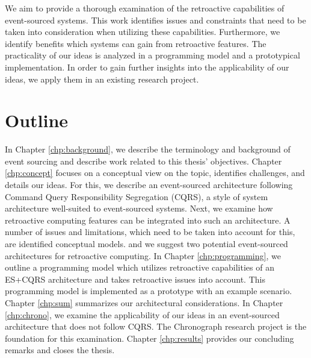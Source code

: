 We aim to provide a thorough examination of the retroactive capabilities of 
event-sourced systems. This work identifies issues and constraints that need 
to be taken into consideration when utilizing these capabilities. Furthermore, 
we identify benefits which systems can gain from retroactive features. The 
practicality of our ideas is analyzed in a programming model and a prototypical 
implementation. In order to gain further insights into the applicability of our 
ideas, we apply them in an existing research project.

\section{Outline}
In Chapter \ref{chp:background}, we describe the terminology and background of 
event sourcing and describe work related to this thesis' objectives. 
%
Chapter \ref{chp:concept} focuses on a conceptual view on the topic, identifies 
challenges, and details our ideas. For this, we describe an event-sourced 
architecture following Command Query Responsibility Segregation (CQRS), a style 
of system architecture well-suited to event-sourced systems. Next, we examine 
how retroactive computing features can be integrated into such an architecture.
A number of issues and limitations, which need to be taken into account for 
this, are identified %
conceptual models. and we suggest two potential event-sourced architectures for 
retroactive computing.
%
In Chapter \ref{chp:programming}, we outline a programming model which utilizes 
retroactive capabilities of an ES+CQRS architecture and takes retroactive issues 
into account.
This programming model is implemented as a prototype with an example scenario.
Chapter \ref{chp:sum} summarizes our architectural considerations.
%
In Chapter \ref{chp:chrono}, we examine the applicability of our ideas in an 
event-sourced architecture that does not follow CQRS. The Chronograph research 
project is the foundation for this examination.
%
Chapter \ref{chp:results} provides our concluding remarks and closes the thesis.
